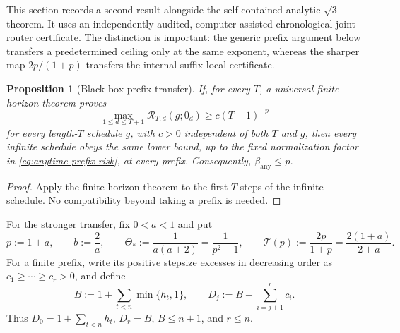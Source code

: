 \documentclass[11pt]{article}
\newtheorem{proposition}[theorem]{Proposition}
\theoremstyle{definition}
\theoremstyle{remark}
\newcommand{\anyexp}{\beta_{\mathrm{any}}}
\newcommand{\Transfer}{\mathcal T}
\begin{document}
This section records a second result alongside the self-contained analytic
\(\sqrt3\) theorem.  It uses an independently audited, computer-assisted
chronological joint-router certificate.  The distinction is important: the
generic prefix argument below transfers a predetermined ceiling only at the
same exponent, whereas the sharper map \(2p/(1+p)\) transfers the internal
suffix-local certificate.

\begin{proposition}[Black-box prefix transfer]
\label{prop:any-black-box}
If, for every \(T\), a universal finite-horizon theorem proves
\[
 \max_{1\le d\le T+1}\mathcal R_{T,d}(g;0_d)
 \ge c(T+1)^{-p}
\]
for every length-\(T\) schedule \(g\), with \(c>0\) independent of both
\(T\) and \(g\), then every infinite schedule obeys
the same lower bound, up to the fixed normalization factor in
\eqref{eq:anytime-prefix-risk}, at every prefix.  Consequently,
\(\anyexp\le p\).
\end{proposition}

\begin{proof}
Apply the finite-horizon theorem to the first \(T\) steps of the infinite
schedule.  No compatibility beyond taking a prefix is needed.
\end{proof}

For the stronger transfer, fix \(0<a<1\) and put
\begin{equation}
 p:=1+a,\qquad b:=\frac2a,\qquad
 \Theta_*:=\frac1{a(a+2)}=\frac1{p^2-1},\qquad
 \Transfer(p):=\frac{2p}{1+p}=\frac{2(1+a)}{2+a}.
 \label{eq:any-parameters}
\end{equation}
For a finite prefix, write its positive stepsize excesses in decreasing order
as \(c_1\ge\cdots\ge c_r>0\), and define
\begin{equation}
 B:=1+\sum_{t<n}\min\{h_t,1\},\qquad
 D_j:=B+\sum_{i=j+1}^r c_i.
 \label{eq:any-ranked-state}
\end{equation}
Thus \(D_0=1+\sum_{t<n}h_t\), \(D_r=B\), \(B\le n+1\), and
\(r\le n\).
\end{document}
